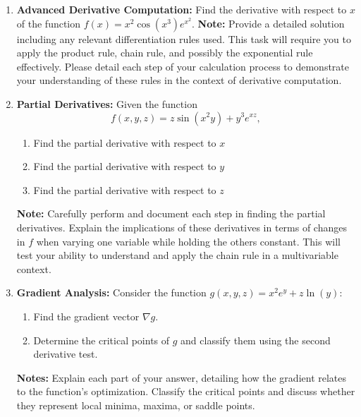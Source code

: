 \documentclass{16384_doc}
\begin{document}
\begin{enumerate}[label=\textbf{Question \alph*},leftmargin=*, align=left]
    \item[\textbf{Question a (5 points)}] \textbf{Advanced Derivative Computation:}
    Find the derivative with respect to $x$ of the function \(f(x) = x^2 \cos(x^3) e^{x^2}\).
    \textbf{Note:} Provide a detailed solution including any relevant differentiation rules used. This task will require you to apply the product rule, chain rule, and possibly the exponential rule effectively. Please detail each step of your calculation process to demonstrate your understanding of these rules in the context of derivative computation.

    \begin{tcolorbox}[height=15cm]
    \end{tcolorbox}

    \item[\textbf{Question b (10 points)}] \textbf{Partial Derivatives:}
    Given the function \[f(x, y, z) = z \sin(x^2 y) + y^3 e^{x z},\]
    \begin{enumerate}[label=(\roman*)]
    \item Find the partial derivative with respect to $x$
    \item Find the partial derivative with respect to $y$
    \item Find the partial derivative with respect to $z$
    \end{enumerate}
    \textbf{Note:} Carefully perform and document each step in finding the partial derivatives. Explain the implications of these derivatives in terms of changes in \(f\) when varying one variable while holding the others constant. This will test your ability to understand and apply the chain rule in a multivariable context.
    
    \begin{tcolorbox}[height=15cm]
    \end{tcolorbox}

    \item[\textbf{Question c (10 points)}] \textbf{Gradient Analysis:}
    Consider the function \(g(x, y, z) = x^2 e^{y} + z \ln(y)\):
    \begin{enumerate}[label=\roman*.]
        \item Find the gradient vector \(\nabla g\).
        \item Determine the critical points of \(g\) and classify them using the second derivative test.
    \end{enumerate}
    \textbf{Notes:} Explain each part of your answer, detailing how the gradient relates to the function’s optimization. Classify the critical points and discuss whether they represent local minima, maxima, or saddle points.

    \begin{tcolorbox}[height=15cm]
    \end{tcolorbox}
\end{enumerate}
\end{document}
